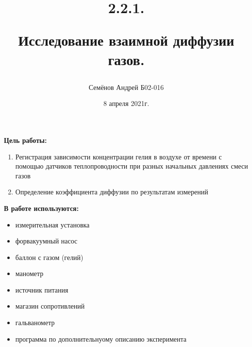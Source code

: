 \documentclass[12pt,a4paper]{article}
\begin{document}
\title{
2.2.1.

Исследование взаимной диффузии газов.
\author{Семёнов Андрей Б02-016}
}
\date{8 апреля 2021г.}

\maketitle

\newpage

\textbf{Цель работы:}
\begin{enumerate}
    \item Регистрация зависимости концентрации гелия в воздухе от времени с помощью датчиков теплопроводности при разных начальных давлениях смеси газов
    \item Определение коэффициента диффузии по результатам измерений
\end{enumerate}

\textbf{В работе используются:}
\begin{itemize}
    \item измерительная установка
    \item форвакуумный насос
    \item баллон с газом (гелий)
    \item манометр
    \item источник питания
    \item магазин сопротивлений
    \item гальванометр
    \item программа по дополнительнуому описанию эксперимента
\end{itemize}
\end{document}
